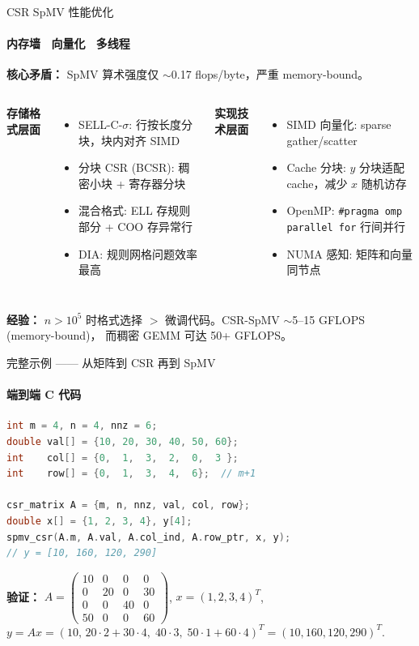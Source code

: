 \documentclass[12pt,aspectratio=169]{beamer}
\begin{document}
\begin{frame}[shrink]{CSR SpMV 性能优化}
\framesubtitle{内存墙 \textperiodcentered\ 向量化 \textperiodcentered\ 多线程}

\small
\textbf{核心矛盾：} SpMV 算术强度仅 $\sim$0.17 flops/byte，严重 memory-bound。

\vspace{4pt}
\begin{columns}[T]
\textbf{存储格式层面}
\begin{itemize}
  \item SELL-C-$\sigma$: 行按长度分块，块内对齐 SIMD
  \item 分块 CSR (BCSR): 稠密小块 + 寄存器分块
  \item 混合格式: ELL 存规则部分 + COO 存异常行
  \item DIA: 规则网格问题效率最高
\end{itemize}

\textbf{实现技术层面}
\begin{itemize}
  \item SIMD 向量化: sparse gather/scatter
  \item Cache 分块: $y$ 分块适配 cache，减少 $x$ 随机访存
  \item OpenMP: \texttt{\#pragma omp parallel for} 行间并行
  \item NUMA 感知: 矩阵和向量同节点
\end{itemize}
\end{columns}

\vspace{4pt}
\textbf{经验：} $n>10^5$ 时格式选择 $>$ 微调代码。CSR-SpMV $\sim$5--15 GFLOPS (memory-bound)，
而稠密 GEMM 可达 50+ GFLOPS。
\end{frame}

\begin{frame}[fragile]{完整示例 —— 从矩阵到 CSR 再到 SpMV}
\framesubtitle{端到端 C 代码}

\footnotesize
\begin{lstlisting}[language=C,basicstyle=\ttfamily\footnotesize,belowskip=-4pt]
int m = 4, n = 4, nnz = 6;
double val[] = {10, 20, 30, 40, 50, 60};
int    col[] = {0,  1,  3,  2,  0,  3 };
int    row[] = {0,  1,  3,  4,  6};  // m+1

csr_matrix A = {m, n, nnz, val, col, row};
double x[] = {1, 2, 3, 4}, y[4];
spmv_csr(A.m, A.val, A.col_ind, A.row_ptr, x, y);
// y = [10, 160, 120, 290]
\end{lstlisting}

\vspace{4pt}
\small
\textbf{验证：} $A=\left(\begin{smallmatrix}10&0&0&0\\0&20&0&30\\0&0&40&0\\50&0&0&60\end{smallmatrix}\right)$,
$x=(1,2,3,4)^T$,
$y=Ax=(10,\,20\cdot2+30\cdot4,\;40\cdot3,\;50\cdot1+60\cdot4)^T=(10,160,120,290)^T$.
\end{frame}
\end{document}
